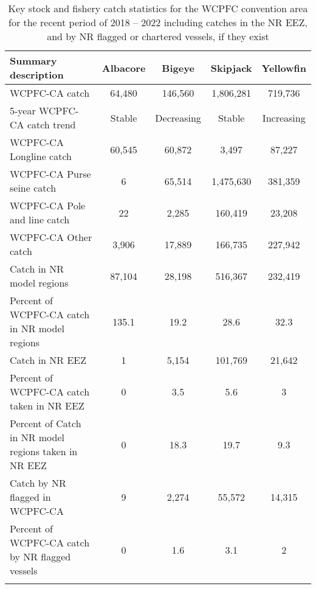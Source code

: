 \begin{longtable}{lcccc}
\caption{Key stock and fishery catch statistics for the WCPFC convention area for the recent period of 2018 -- 2022 including catches in the NR EEZ, and by NR flagged or chartered vessels, if they exist} \\ 
  \hline
Summary description & Albacore & Bigeye & Skipjack & Yellowfin \\ 
  \hline
WCPFC-CA catch & 64,480 & 146,560 & 1,806,281 & 719,736 \\ 
  5-year WCPFC-CA catch trend & Stable & Decreasing & Stable & Increasing \\ 
  WCPFC-CA Longline catch & 60,545 & 60,872 & 3,497 & 87,227 \\ 
  WCPFC-CA Purse seine catch & 6 & 65,514 & 1,475,630 & 381,359 \\ 
  WCPFC-CA Pole and line catch & 22 & 2,285 & 160,419 & 23,208 \\ 
  WCPFC-CA Other catch & 3,906 & 17,889 & 166,735 & 227,942 \\ 
  Catch in NR model regions & 87,104 & 28,198 & 516,367 & 232,419 \\ 
  Percent of WCPFC-CA catch in NR model regions & 135.1 & 19.2 & 28.6 & 32.3 \\ 
   \hline
Catch in NR EEZ & 1 & 5,154 & 101,769 & 21,642 \\ 
  Percent of WCPFC-CA catch taken in NR EEZ & 0 & 3.5 & 5.6 & 3 \\ 
  Percent of Catch in NR model regions taken in NR EEZ & 0 & 18.3 & 19.7 & 9.3 \\ 
  Catch by NR flagged in WCPFC-CA & 9 & 2,274 & 55,572 & 14,315 \\ 
  Percent of WCPFC-CA catch by NR flagged vessels & 0 & 1.6 & 3.1 & 2 \\ 
  \hline
\label{cat_sum_tab}
\end{longtable}
